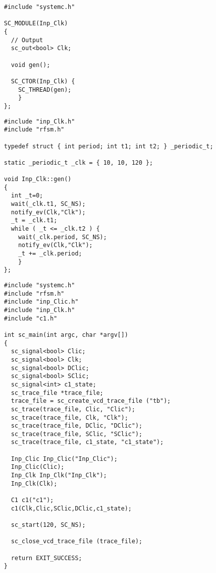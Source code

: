 \begin{lstlisting}[language=systemc,frame=single,numbers=none,basicstyle=\small,caption=File inp_Clk.h]
#include "systemc.h"

SC_MODULE(Inp_Clk)
{
  // Output
  sc_out<bool> Clk;

  void gen();

  SC_CTOR(Inp_Clk) {
    SC_THREAD(gen);
    }
};
\end{lstlisting}

\begin{lstlisting}[language=systemc,frame=single,numbers=none,basicstyle=\small,caption=File
  inp_Clk.cpp]
#include "inp_Clk.h"
#include "rfsm.h"

typedef struct { int period; int t1; int t2; } _periodic_t;

static _periodic_t _clk = { 10, 10, 120 };

void Inp_Clk::gen()
{
  int _t=0;
  wait(_clk.t1, SC_NS);
  notify_ev(Clk,"Clk");
  _t = _clk.t1;
  while ( _t <= _clk.t2 ) {
    wait(_clk.period, SC_NS);
    notify_ev(Clk,"Clk");
    _t += _clk.period;
    }
};
\end{lstlisting}

\begin{lstlisting}[language=systemc,frame=single,numbers=none,basicstyle=\small,caption=File tb.cpp]
#include "systemc.h"
#include "rfsm.h"
#include "inp_Clic.h"
#include "inp_Clk.h"
#include "c1.h"

int sc_main(int argc, char *argv[])
{
  sc_signal<bool> Clic;
  sc_signal<bool> Clk;
  sc_signal<bool> DClic;
  sc_signal<bool> SClic;
  sc_signal<int> c1_state;
  sc_trace_file *trace_file;
  trace_file = sc_create_vcd_trace_file ("tb");
  sc_trace(trace_file, Clic, "Clic");
  sc_trace(trace_file, Clk, "Clk");
  sc_trace(trace_file, DClic, "DClic");
  sc_trace(trace_file, SClic, "SClic");
  sc_trace(trace_file, c1_state, "c1_state");

  Inp_Clic Inp_Clic("Inp_Clic");
  Inp_Clic(Clic);
  Inp_Clk Inp_Clk("Inp_Clk");
  Inp_Clk(Clk);

  C1 c1("c1");
  c1(Clk,Clic,SClic,DClic,c1_state);

  sc_start(120, SC_NS);

  sc_close_vcd_trace_file (trace_file);

  return EXIT_SUCCESS;
}
\end{lstlisting}

